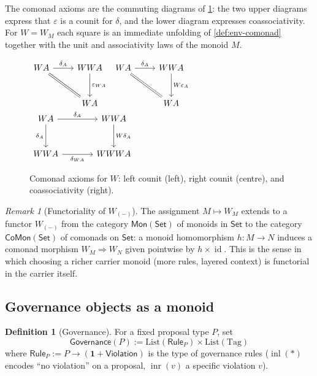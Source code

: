 \documentclass[journal,10pt]{IEEEtran}
\theoremstyle{plain}
\theoremstyle{definition}
\newtheorem{definition}[theorem]{Definition}
\theoremstyle{remark}
\newtheorem{remark}[theorem]{Remark}
\newcommand{\Set}{\mathsf{Set}}
\newcommand{\Mon}{\mathsf{Mon}}
\newcommand{\CoMon}{\mathsf{CoMon}}
\DeclareMathOperator{\id}{id}
\DeclareMathOperator{\inl}{inl}
\DeclareMathOperator{\inr}{inr}
\newcommand{\Governance}{\mathsf{Governance}}
\newcommand{\Rulet}{\mathsf{Rule}}
\newcommand{\Violation}{\mathsf{Violation}}
\begin{document}
The comonad axioms are the commuting diagrams of
\cref{fig:comonad-axioms}: the two upper diagrams express that
$\varepsilon$ is a counit for $\delta$, and the lower diagram
expresses coassociativity. For $W = W_M$ each square is an immediate
unfolding of \cref{def:env-comonad} together with the unit and
associativity laws of the monoid $M$.

\begin{figure}[!t]
\centering
$\begin{tikzcd}[column sep=normal, row sep=large, ampersand replacement=\&]
W A \arrow[r, "\delta_A"] \arrow[dr, equal] \&
W W A \arrow[d, "\varepsilon_{W A}"] \\
\& W A
\end{tikzcd}$
\qquad
$\begin{tikzcd}[column sep=normal, row sep=large, ampersand replacement=\&]
W A \arrow[r, "\delta_A"] \arrow[dr, equal] \&
W W A \arrow[d, "W \varepsilon_A"] \\
\& W A
\end{tikzcd}$
\qquad
$\begin{tikzcd}[column sep=large, row sep=large, ampersand replacement=\&]
W A \arrow[r, "\delta_A"] \arrow[d, "\delta_A"'] \&
W W A \arrow[d, "W \delta_A"] \\
W W A \arrow[r, "\delta_{W A}"'] \&
W W W A
\end{tikzcd}$
\caption{Comonad axioms for $W$: left counit (left), right counit
(centre), and coassociativity (right).}
\label{fig:comonad-axioms}
\end{figure}

\begin{remark}[Functoriality of $W_{(-)}$]\label{rem:functoriality}
The assignment $M \mapsto W_M$ extends to a functor $W_{(-)}$ from
the category $\Mon(\Set)$ of monoids in $\Set$ to the category
$\CoMon(\Set)$ of comonads on $\Set$: a monoid homomorphism
$h \colon M \to N$ induces a comonad morphism $W_M \Rightarrow W_N$
given pointwise by $h \times \id$. This is the sense in which
choosing a richer carrier monoid (more rules, layered context) is
functorial in the carrier itself.
\end{remark}

\subsection{Governance objects as a monoid}

\begin{definition}[Governance]\label{def:governance}
For a fixed proposal type $P$, set
\[
\Governance(P) := \mathrm{List}(\Rulet_P) \times \mathrm{List}(\mathrm{Tag})
\]
where $\Rulet_P := P \to (\mathbf{1} + \Violation)$ is the type of
governance rules ($\inl(*)$ encodes ``no violation'' on a proposal,
$\inr(v)$ a specific violation $v$).
\end{definition}
\end{document}
